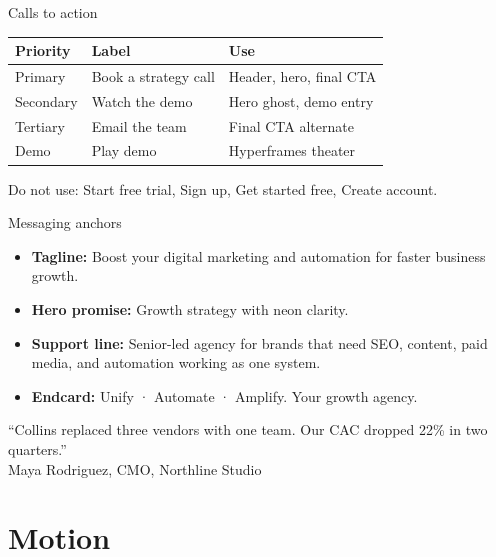 \documentclass[aspectratio=169,10pt]{beamer}
\begin{document}
\begin{frame}{Calls to action}

  \vspace{0.8em}
  \begin{tabular}{@{}p{}p{}p{}@{}}
    \toprule
    \textbf{Priority} & \textbf{Label} & \textbf{Use} \\
    \midrule
    Primary & Book a strategy call & Header, hero, final CTA \\
    Secondary & Watch the demo & Hero ghost, demo entry \\
    Tertiary & Email the team & Final CTA alternate \\
    Demo & Play demo & Hyperframes theater \\
    \bottomrule
  \end{tabular}

  \vspace{0.8em}
  {\color{collinsSecondary}Do not use: Start free trial, Sign up, Get started free, Create account.}
\end{frame}

\begin{frame}{Messaging anchors}
  \begin{itemize}
    \item \textbf{Tagline:} Boost your digital marketing and automation for faster business growth.
    \item \textbf{Hero promise:} Growth strategy with neon clarity.
    \item \textbf{Support line:} Senior-led agency for brands that need SEO, content, paid media, and automation working as one system.
    \item \textbf{Endcard:} Unify · Automate · Amplify. Your growth agency.
  \end{itemize}

  \vspace{0.6em}
  \vspace{0.3em}
  {\small ``Collins replaced three vendors with one team. Our CAC dropped 22\% in two quarters.''\\
  \color{collinsSecondary}Maya Rodriguez, CMO, Northline Studio}
\end{frame}

\section{Motion}
\end{document}
